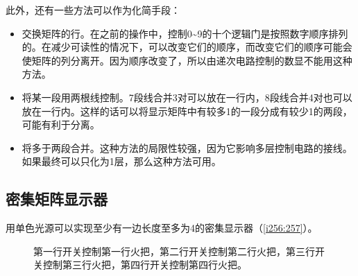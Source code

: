 此外，还有一些方法可以作为化简手段：
\begin{itemize}
\item 交换矩阵的行。在之前的操作中，控制0\~{}9的十个逻辑门是按照数字顺序排列的。在减少可读性的情况下，可以改变它们的顺序，而改变它们的顺序可能会使矩阵的列分离开。因为顺序改变了，所以由递次电路控制的数显不能用这种方法。
\item 将某一段用两根线控制。7段线合并3对可以放在一行内，8段线合并4对也可以放在一行内。这样的话可以将显示矩阵中有较多1的一段分成有较少1的两段，可能有利于分离。
\item 将多于两段合并。这种方法的局限性较强，因为它影响多层控制电路的接线。如果最终可以只化为1层，那么这种方法可用。
\end{itemize}

\subsection{密集矩阵显示器}
用单色光源可以实现至少有一边长度至多为4的密集显示器（\autoref{i256:257}）。

\begin{figure}[!h]
\begin{center}
\qquad
{}
\end{center}
\caption{第一行开关控制第一行火把，第二行开关控制第二行火把，第三行开关控制第三行火把，第四行开关控制第四行火把。}
\label{i256:257}
\end{figure}

